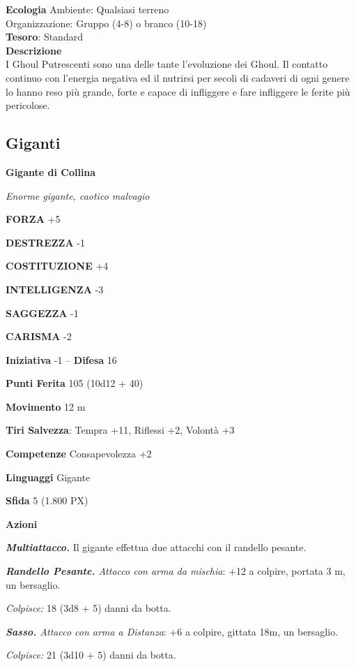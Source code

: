 \begin{multicols}{2}
	\textbf{Ecologia}
	Ambiente: Qualsiasi terreno\\
	Organizzazione: Gruppo (4-8) o branco (10-18)\\
	\textbf{Tesoro}: Standard\\
	\textbf{Descrizione}\\
	I Ghoul Putrescenti sono una delle tante l'evoluzione dei Ghoul. Il contatto continuo con l'energia negativa ed il nutrirsi per secoli di cadaveri di ogni genere lo hanno reso più grande, forte e capace di infliggere e fare infliggere le ferite più pericolose.


	\subsection{Giganti}

	\medskip{}\textbf{Gigante di Collina}

	\textit{Enorme gigante, caotico malvagio}

	\textbf{FORZA} +5

	\textbf{DESTREZZA} -1

	\textbf{COSTITUZIONE} +4

	\textbf{INTELLIGENZA} -3

	\textbf{SAGGEZZA} -1

	\textbf{CARISMA} -2

	\textbf{Iniziativa} -1 -- \textbf{Difesa} 16

	\textbf{Punti Ferita} 105 (10d12 + 40)

	\textbf{Movimento} 12 m

	\textbf{Tiri Salvezza}: Tempra +11, Riflessi +2, Volontà +3

	\textbf{Competenze} Consapevolezza +2

	\textbf{Linguaggi} Gigante

	\textbf{Sfida} 5 (1.800 PX)

	\textbf{Azioni}

	\textit{\textbf{Multiattacco.}} Il gigante effettua due attacchi con il randello pesante.

	\textit{\textbf{Randello Pesante.} Attacco con arma da mischia}: +12 a colpire, portata 3 m, un bersaglio.

	\textit{Colpisce:} 18 (3d8 + 5) danni da botta.

	\textit{\textbf{Sasso.} Attacco con arma a Distanza}: +6 a colpire, gittata 18m, un bersaglio.

	\textit{Colpisce:} 21 (3d10 + 5) danni da botta.


\end{multicols}
